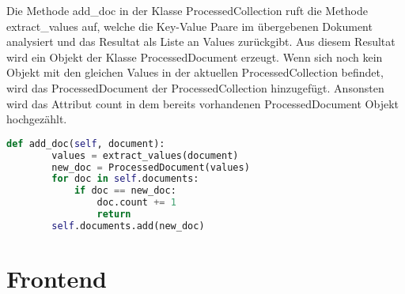Die Methode add\_doc in der Klasse ProcessedCollection ruft die Methode extract\_values auf, welche die Key-Value Paare im übergebenen Dokument analysiert und das Resultat als Liste an Values zurückgibt.
Aus diesem Resultat wird ein Objekt der Klasse ProcessedDocument erzeugt.
Wenn sich noch kein Objekt mit den gleichen Values in der aktuellen ProcessedCollection befindet, wird das ProcessedDocument der ProcessedCollection hinzugefügt.
Ansonsten wird das Attribut count in dem bereits vorhandenen ProcessedDocument Objekt hochgezählt.


\begin{lstlisting}[language=python, caption={ProcessedCollection.add\_doc},label={lst:backend_add_doc}]
    def add_doc(self, document):
        values = extract_values(document)
        new_doc = ProcessedDocument(values)
        for doc in self.documents:
            if doc == new_doc:
                doc.count += 1
                return
        self.documents.add(new_doc)
\end{lstlisting}

\section{Frontend}
\label{sec:frontend}

\subsection{}
\label{sub:rest_api}

